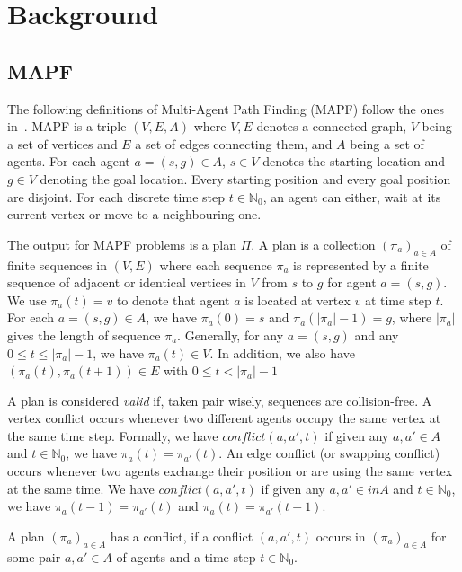 \section{Background}\label{sec:background}

\subsection{MAPF}\label{sec:background_mapf}

The following definitions of Multi-Agent Path Finding (MAPF) follow the ones in~\cite{husvobbass22a}. MAPF is a triple $(V,E,A)$ where \(V,E\) denotes a connected graph, \(V\) being a set of vertices and \(E\) a set of edges connecting them, and \(A\) being a set of agents. For each agent \(a=(s,g) \in A\), \(s \in V\) denotes the starting location and \(g \in V\) denoting the goal location. Every starting position and every goal position are disjoint.
For each discrete time step \(t\in \mathbb{N}_0\), an agent can either, wait at its current vertex or move to a neighbouring one.

The output for MAPF problems is a plan \(\Pi\). A plan is a collection $(\pi_a)_{a\in A}$ of finite sequences in $(V,E)$ where each sequence $\pi_a$ is represented by a finite sequence of adjacent or identical vertices in $V$ from $s$ to $g$ for agent $a = (s,g)$. We use \(\pi_a (t) = v\) to denote that agent \(a\) is located at vertex \(v\) at time step \(t\). 
For each \(a=(s,g) \in A\), we have $\pi_a(0) = s$ and  $\pi_a(|\pi_a|-1) = g$, where $|\pi_a|$ gives the length of sequence $\pi_a$. Generally, for any \(a=(s,g)\) and any $0 \leq t \leq |\pi_a|-1$, we have \(\pi_a(t) \in V\). In addition, we also have $(\pi_a(t),\pi_a(t+1))\in E$ with $0 \leq t < |\pi_a|-1$

A plan is considered  \textit{valid} if, taken pair wisely, sequences are collision-free. A vertex conflict occurs whenever two different agents occupy the same vertex at the same time step. Formally, we have \(conflict(a,a',t)\) if given any $a,a'\in A$  and $t\in\mathbb{N}_0$, we have $\pi_a(t) = \pi_{a'}(t)$. An edge conflict (or swapping conflict) occurs whenever two agents exchange their position or are using the same vertex at the same time. We have \(conflict(a,a',t)\) if given any $a,a'\in in A$  and $t\in\mathbb{N}_0$, we have $\pi_a(t-1) = \pi_{a'}(t)$ and $\pi_a(t) = \pi_{a'}(t-1)$.

A plan $(\pi_a)_{a\in A}$ has a conflict, if a conflict $(a, a',t)$ occurs in $(\pi_a)_{a\in A}$ for some pair $a,a'\in A$ of agents and a time step $t\in\mathbb{N}_0$.

